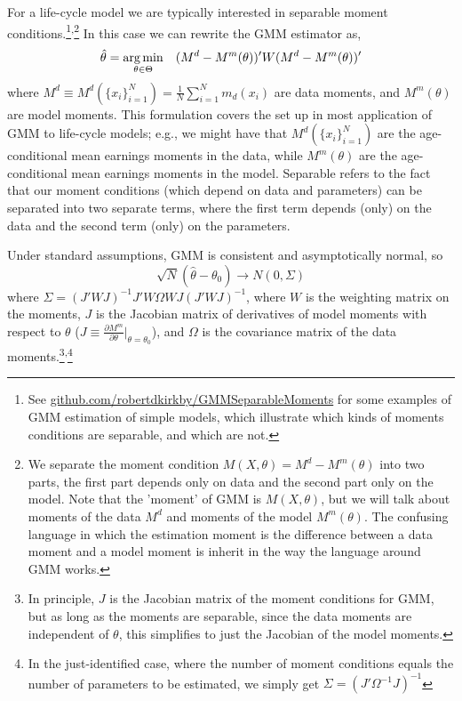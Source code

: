 For a life-cycle model we are typically interested in separable moment conditions.\footnote{See \href{https://github.com/robertdkirkby/GMMSeparableMoments}{github.com/robertdkirkby/GMMSeparableMoments} for some examples of GMM estimation of simple models, which illustrate which kinds of moments conditions are separable, and which are not.}\textsuperscript{,}\footnote{We separate the moment condition $M(X,\theta)=M^d-M^m(\theta)$ into two parts, the first part depends only on data and the second part only on the model. Note that the 'moment' of GMM is $M(X,\theta)$, but we will talk about moments of the data $M^d$ and moments of the model $M^m(\theta)$. The confusing language in which the estimation moment is the difference between a data moment and a model moment is inherit in the way the language around GMM works.} In this case we can rewrite the GMM estimator as,
\begin{equation} \label{eqn:GMM2}
 \hat{\theta} = \operatorname*{arg\,min}_{\theta \in \Theta} \quad (M^d-M^m(\theta))' W (M^d-M^m(\theta))'
\end{equation}
where $M^d\equiv M^d(\{x_i\}_{i=1}^N)=\frac{1}{N}\sum_{i=1}^N m_d(x_i)$ are data moments, and $M^m(\theta)$ are model moments. This formulation covers the set up in most application of GMM to life-cycle models; e.g., we might have that $M^d(\{x_i\}_{i=1}^N)$ are the age-conditional mean earnings moments in the data, while $M^m(\theta)$ are the age-conditional mean earnings moments in the model. Separable refers to the fact that our moment conditions (which depend on data and parameters) can be separated into two separate terms, where the first term depends (only) on the data and the second term (only) on the parameters.

Under standard assumptions, GMM is consistent and asymptotically normal, so
\begin{equation*}
 \sqrt{N}(\hat{\theta}-\theta_0) \to N(0,\Sigma)
\end{equation*}
where $\Sigma=(J'WJ)^{-1} J' W \Omega W J (J'W J)^{-1}$, where $W$ is the weighting matrix on the moments, $J$ is the Jacobian matrix of derivatives of model moments with respect to $\theta$ ($J\equiv \frac{\partial M^m}{\partial \theta} \big|_{\theta=\theta_0} $), and $\Omega$ is the covariance matrix of the data moments.\footnote{In principle, $J$ is the Jacobian matrix of the moment conditions for GMM, but as long as the moments are separable, since the data moments are independent of $\theta$, this simplifies to just the Jacobian of the model moments.}\textsuperscript{,}\footnote{In the just-identified case, where the number of moment conditions equals the number of parameters to be estimated, we simply get $\Sigma=(J'\Omega^{-1} J)^{-1}$}

